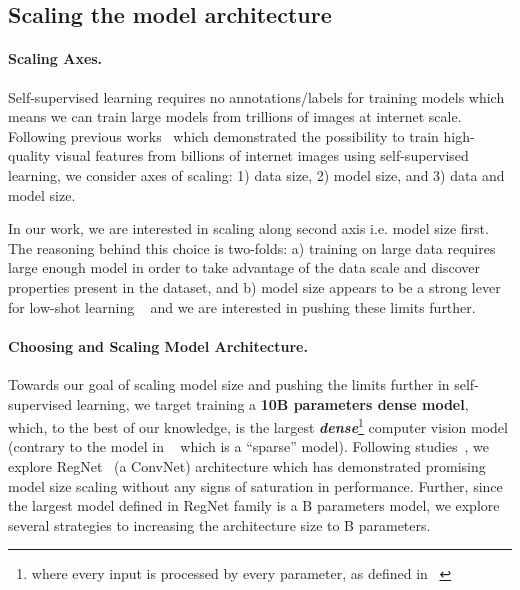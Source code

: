 \documentclass[10pt,twocolumn,letterpaper]{article}
\newcommand{\regnet}{RegNet\xspace}
\begin{document}
\subsection{Scaling the model architecture}

\paragraph{Scaling Axes.}
Self-supervised learning requires no annotations/labels for training models which means we can train large models from trillions of images at internet scale. Following previous works~\cite{goyal2021self,caron2020unsupervised} which demonstrated the possibility to train high-quality visual features from billions of internet images using self-supervised learning, we consider  axes of scaling: 1) data size, 2) model size, and 3) data and model size. 

In our work, we are interested in scaling along second axis i.e. model size first. The reasoning behind this choice is two-folds: a) training on large data requires large enough model in order to take advantage of the data scale and discover properties present in the dataset, and b) model size appears to be a strong lever for low-shot learning ~\cite{goyal2021self} and we are interested in pushing these limits further.

\paragraph{Choosing and Scaling Model Architecture.} 
\label{sec:approach_scaling_architecture}
Towards our goal of scaling model size and pushing the limits further in self-supervised learning, we target training a \textbf{10B parameters dense model},  which, to the best of our knowledge, is the largest \textit{\textbf{dense}}\footnote{where every input is processed by every parameter, as defined in ~\cite{riquelme2021scaling}} computer vision model (contrary to the model in ~\cite{riquelme2021scaling} which is a ``sparse'' model). Following studies~\cite{goyal2021self}, we explore \regnet~\cite{radosavovic2020designing} (a ConvNet) architecture which has demonstrated promising model size scaling without any signs of saturation in performance. Further, since the largest model defined in \regnet family is a B parameters model, we explore several strategies to increasing the architecture size to B parameters. 
\end{document}
